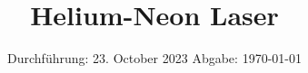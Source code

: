 

\subject{V61}
\title{Helium-Neon Laser}
\date{%
  Durchführung: 23. October 2023
  \hspace{3em}
  Abgabe: \today
}



\maketitle
\thispagestyle{empty}
\tableofcontents
\newpage








\printbibliography{}
%


